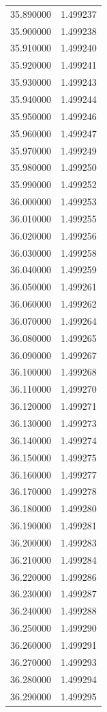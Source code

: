 \begin{tabular}{rr}
35.890000 & 1.499237 \\
35.900000 & 1.499238 \\
35.910000 & 1.499240 \\
35.920000 & 1.499241 \\
35.930000 & 1.499243 \\
35.940000 & 1.499244 \\
35.950000 & 1.499246 \\
35.960000 & 1.499247 \\
35.970000 & 1.499249 \\
35.980000 & 1.499250 \\
35.990000 & 1.499252 \\
36.000000 & 1.499253 \\
36.010000 & 1.499255 \\
36.020000 & 1.499256 \\
36.030000 & 1.499258 \\
36.040000 & 1.499259 \\
36.050000 & 1.499261 \\
36.060000 & 1.499262 \\
36.070000 & 1.499264 \\
36.080000 & 1.499265 \\
36.090000 & 1.499267 \\
36.100000 & 1.499268 \\
36.110000 & 1.499270 \\
36.120000 & 1.499271 \\
36.130000 & 1.499273 \\
36.140000 & 1.499274 \\
36.150000 & 1.499275 \\
36.160000 & 1.499277 \\
36.170000 & 1.499278 \\
36.180000 & 1.499280 \\
36.190000 & 1.499281 \\
36.200000 & 1.499283 \\
36.210000 & 1.499284 \\
36.220000 & 1.499286 \\
36.230000 & 1.499287 \\
36.240000 & 1.499288 \\
36.250000 & 1.499290 \\
36.260000 & 1.499291 \\
36.270000 & 1.499293 \\
36.280000 & 1.499294 \\
36.290000 & 1.499295 \\

\end{tabular}
